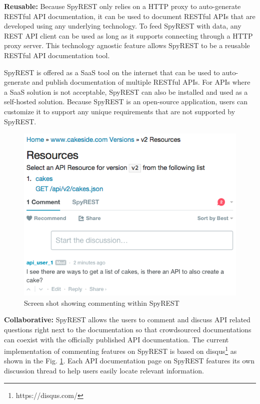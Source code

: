 \documentclass[conference]{IEEEtran}
\begin{document}
\textbf{Reusable:} Because SpyREST only relies on a HTTP proxy to auto-generate RESTful API documentation, it can be used to document RESTful APIs that are developed using any underlying technology. To feed SpyREST with data, any REST API client can be used as long as it supports connecting through a HTTP proxy server. This technology agnostic feature allows SpyREST to be a reusable RESTful API documentation tool.

SpyREST is offered as a SaaS tool on the internet that can be used to auto-generate and publish documentation of multiple RESTful APIs. For APIs where a SaaS solution is not acceptable, SpyREST can also be installed and used as a self-hosted solution. Because SpyREST is an open-source application, users can customize it to support any unique requirements that are not supported by SpyREST.

\begin{figure}[!tbh]
  \centering
  \includegraphics[width=\linewidth]{comments.png}
  \caption{Screen shot showing commenting within SpyREST}
  \label{fig:comments}
\end{figure}


\textbf{Collaborative:} SpyREST allows the users to comment and discuss API related questions right next to the documentation so that crowdsourced documentations can coexist with the officially published API documentation. The current implementation of commenting features on SpyREST is based on disqus\footnote{https://disqus.com/} as shown in the Fig. \ref{fig:comments}. Each API documentation page on SpyREST features its own discussion thread to help users easily locate relevant information.
\end{document}

